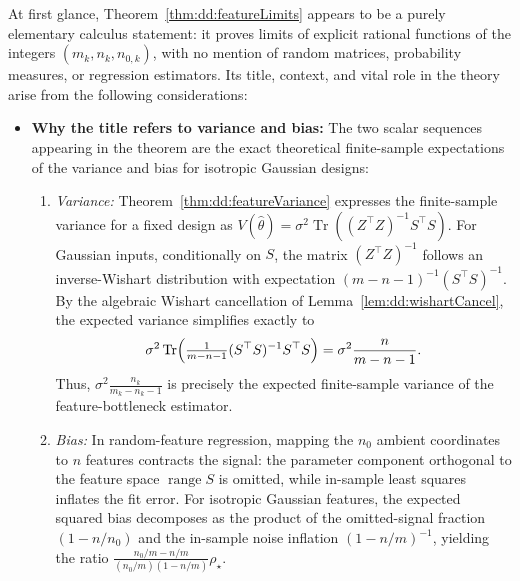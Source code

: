 \begin{remark}\label{rmk:dd:featureLimitsContext}
At first glance, Theorem~\ref{thm:dd:featureLimits} appears to be a purely elementary calculus statement: 
it proves limits of explicit rational functions of the integers $(m_k,n_k,n_{0,k})$, with no mention of random matrices, 
probability measures, or regression estimators. 
Its title, context, and vital role in the theory arise from the following considerations:
\begin{itemize}
  \item \textbf{Why the title refers to variance and bias:}
  The two scalar sequences appearing in the theorem are the exact theoretical finite-sample expectations of the variance and bias for isotropic Gaussian designs:
  \begin{enumerate}
    \item \emph{Variance:} Theorem~\ref{thm:dd:featureVariance} expresses the finite-sample variance for a fixed design as $V(\hat\theta)=\sigma^2\operatorname{Tr}((Z^\top Z)^{-1}S^\top S)$. For Gaussian inputs, conditionally on $S$, the matrix $(Z^\top Z)^{-1}$ follows an inverse-Wishart distribution with expectation $(m-n-1)^{-1}(S^\top S)^{-1}$. By the algebraic Wishart cancellation of Lemma~\ref{lem:dd:wishartCancel}, the expected variance simplifies exactly to
    \[
      \sigma^2\operatorname{Tr}\Bigl(\tfrac{1}{m-n-1}(S^\top S)^{-1}S^\top S\Bigr) = \sigma^2\frac{n}{m-n-1}.
    \]
    Thus, $\sigma^2\frac{n_k}{m_k-n_k-1}$ is precisely the expected finite-sample variance of the feature-bottleneck estimator.
    \item \emph{Bias:} In random-feature regression, 
    mapping the $n_0$ ambient coordinates to $n$ features contracts the signal: 
    the parameter component orthogonal to the feature space $\operatorname{range}S$ is omitted, while in-sample least squares inflates the fit error. For isotropic Gaussian features, the expected squared bias decomposes as the product of the omitted-signal fraction $(1 - n/n_0)$ and the in-sample noise inflation $(1 - n/m)^{-1}$, yielding the ratio $\frac{n_0/m - n/m}{(n_0/m)(1 - n/m)}\rho_\star$.
  \end{enumerate}


\end{itemize}
\end{remark}
